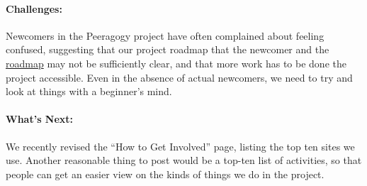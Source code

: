 \paragraph{Challenges:} Newcomers in the Peeragogy project have often
complained about feeling confused, suggesting that our project roadmap
that the newcomer and
the \href{http://peeragogy.org/practice/roadmap/}{roadmap} may not be
sufficiently clear, and that more work has to be done the project
accessible. Even in the absence of actual newcomers, we need to try and
look at things with a beginner's mind.

\paragraph{What's Next:} We recently revised the ``How to Get Involved''
page, listing the top ten sites we use. Another reasonable thing to post
would be a top-ten list of activities, so that people can get an easier
view on the kinds of things we do in the project.
